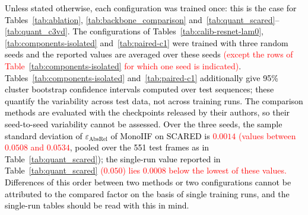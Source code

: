 \documentclass[a4paper,fleqn]{cas-dc}
\begin{document}
{\textcolor{black}
{
Unless stated otherwise, each configuration was trained once: this is the case for
Tables~\ref{tab:ablation}, \ref{tab:backbone_comparison} and~\ref{tab:quant_scared}--\ref{tab:quant_c3vd}.
The configurations of Tables~\ref{tab:calib-resnet-lam0}, \ref{tab:components-isolated}
and~\ref{tab:paired-c1} were trained with three random seeds and the reported values are averaged over these seeds \textcolor{red}{(except the rows of Table~\ref{tab:components-isolated} for which one seed is indicated)}. Tables~\ref{tab:components-isolated} and~\ref{tab:paired-c1} additionally
give 95\% cluster bootstrap confidence intervals computed over test sequences; these quantify the
variability across test data, not across training runs. The comparison methods are evaluated with
the checkpoints released by their authors, so their seed-to-seed variability cannot be assessed.
Over the three seeds, the sample standard deviation of $\varepsilon_\textrm{AbsRel}$ of MonoIIF on
SCARED is \textcolor{red}{$0.0014$ (values between $0.0508$ and $0.0534$}, pooled over the 551 test frames as in
Table~\ref{tab:quant_scared}); the single-run value reported in Table~\ref{tab:quant_scared}
\textcolor{red}{($0.050$) lies 0.0008 below the lowest of these values.} Differences of this order between two methods or two
configurations cannot be attributed to the compared factor on the basis of single training runs,
and the single-run tables should be read with this in mind.}
}
\end{document}
